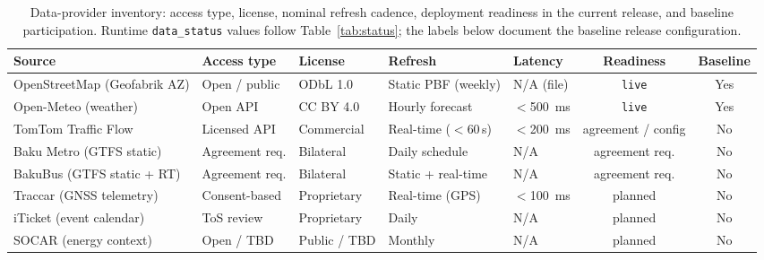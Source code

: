 \begin{table}[t]
\caption{Data-provider inventory: access type, license, nominal refresh cadence,
         deployment readiness in the current release, and baseline participation.
         Runtime \texttt{data\_status} values follow Table~\ref{tab:status};
         the labels below document the baseline release configuration.}
\label{tab:providers}
\centering
\renewcommand{\arraystretch}{1.20}
\begin{tabular}{@{}lllllcc@{}}
\toprule
\textbf{Source} &
\textbf{Access type} &
\textbf{License} &
\textbf{Refresh} &
\textbf{Latency} &
\textbf{Readiness} &
\textbf{Baseline} \\
\midrule
OpenStreetMap (Geofabrik AZ)
  & Open / public  & ODbL 1.0     & Static PBF (weekly) & N/A (file) & \texttt{live}             & Yes \\
Open-Meteo (weather)
  & Open API       & CC BY 4.0    & Hourly forecast     & $<$\SI{500}{ms}   & \texttt{live}             & Yes \\
TomTom Traffic Flow
  & Licensed API   & Commercial   & Real-time ($<$60\,s) & $<$\SI{200}{ms} & agreement / config & No  \\
Baku Metro (GTFS static)
  & Agreement req. & Bilateral    & Daily schedule      & N/A               & agreement req.    & No  \\
BakuBus (GTFS static + RT)
  & Agreement req. & Bilateral    & Static + real-time  & N/A               & agreement req.    & No  \\
Traccar (GNSS telemetry)
  & Consent-based  & Proprietary  & Real-time (GPS)     & $<$\SI{100}{ms}   & planned           & No  \\
iTicket (event calendar)
  & ToS review     & Proprietary  & Daily               & N/A               & planned           & No  \\
SOCAR (energy context)
  & Open / TBD     & Public / TBD & Monthly             & N/A               & planned           & No  \\
\bottomrule
\end{tabular}
\end{table}
